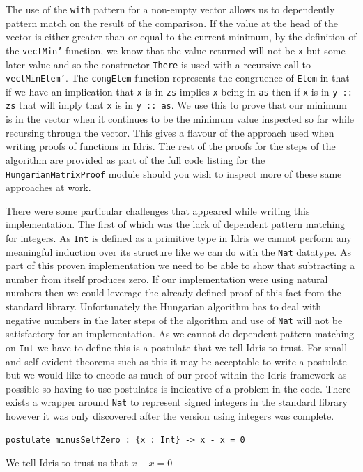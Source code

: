 \documentclass[a4paper, notitlepage]{report}
\begin{document}
The use of the \texttt{with} pattern for a non-empty vector allows us to dependently
pattern match on the result of the comparison. If the value at the head of the
vector is either greater than or equal to the current minimum, by the definition
of the \texttt{vectMin'} function, we know that the value returned will not be \texttt{x} but some
later value and so the constructor \texttt{There} is used with a recursive call to
\texttt{vectMinElem'}. The \texttt{congElem} function represents the congruence of \texttt{Elem} in that if
we have an implication that \texttt{x} is in \texttt{zs} implies \texttt{x} being in \texttt{as} then if \texttt{x} is in \texttt{y
:: zs} that will imply that \texttt{x} is in \texttt{y :: as}. We use this to prove that our
minimum is in the vector when it continues to be the minimum value inspected so
far while recursing through the vector. This gives a flavour of the approach
used when writing proofs of functions in Idris. The rest of the proofs for the
steps of the algorithm are provided as part of the full code listing for the
\texttt{HungarianMatrixProof} module should you wish to inspect more of these same
approaches at work.

There were some particular challenges that appeared while writing this
implementation. The first of which was the lack of dependent pattern matching
for integers. As \texttt{Int} is defined as a primitive type in Idris we cannot perform
any meaningful induction over its structure like we can do with the \texttt{Nat}
datatype. As part of this proven implementation we need to be able to show that
subtracting a number from itself produces zero. If our implementation were using
natural numbers then we could leverage the already defined proof of this fact
from the standard library. Unfortunately the Hungarian algorithm has to deal
with negative numbers in the later steps of the algorithm and use of \texttt{Nat} will
not be satisfactory for an implementation. As we cannot do dependent pattern
matching on \texttt{Int} we have to define this is a postulate that we tell Idris to
trust. For small and self-evident theorems such as this it may be acceptable to
write a postulate but we would like to encode as much of our proof within the
Idris framework as possible so having to use postulates is indicative of a
problem in the code. There exists a wrapper around \texttt{Nat} to represent signed
integers in the standard library however it was only discovered after the
version using integers was complete.

\begin{listing}[H]
\begin{verbatim}
postulate minusSelfZero : {x : Int} -> x - x = 0
\end{verbatim}
\caption{We tell Idris to trust us that \(x\mathbin{-} x \mathrel{=} 0\)}
\end{listing}
\end{document}
